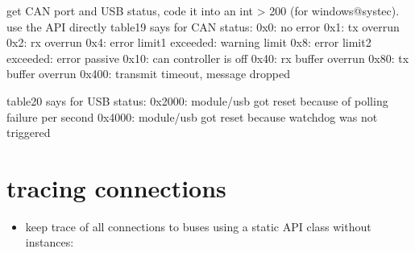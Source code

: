 \documentclass[a4paper,10pt,english]{sphinxmanual}
\begin{document}
\begin{fulllineitems}
\begin{fulllineitems}
\begin{description}
\begin{itemize}
\end{itemize}

\end{description}


\end{fulllineitems}


\begin{fulllineitems}
\label{\detokenize{classestracing:_CPPv4N9STCanScan13getPortStatusEv}}%
\pysigstartmultiline
{}%
\pysigstopmultiline
get CAN port and USB status, code it into an int \textgreater{} 200 (for windows@systec). use the API directly table19 says for CAN status: 0x0: no error 0x1: tx overrun 0x2: rx overrun 0x4: error limit1 exceeded: warning limit 0x8: error limit2 exceeded: error passive 0x10: can controller is off 0x40: rx buffer overrun 0x80: tx buffer overrun 0x400: transmit timeout, message dropped

table20 says for USB status: 0x2000: module/usb got reset because of polling failure per second 0x4000: module/usb got reset because watchdog was not triggered 

\end{fulllineitems}


\end{fulllineitems}



\section{tracing connections}
\label{\detokenize{classestracing:tracing-connections}}\begin{itemize}
\item {} 
keep trace of all connections to buses using a static API class without instances:

\end{itemize}
\end{document}
